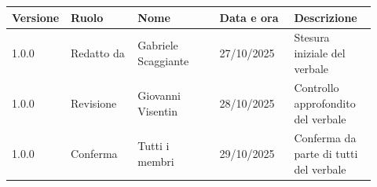 \documentclass[a4paper,12pt]{article}
\begin{document}
\begin{center}
\small
\renewcommand{\arraystretch}{1.2} 
\begin{tabular}{|p{0.1\linewidth}|p{0.18\linewidth}|p{0.22\linewidth}|p{0.20\linewidth}|p{0.22\linewidth}|}
\hline
\rowcolor{gray!60} 
\textbf{Versione} & \textbf{Ruolo} & \textbf{Nome} & \textbf{Data e ora} & \textbf{Descrizione} \\
\hline
\rowcolor{white}
1.0.0 & Redatto da & Gabriele Scaggiante & 27/10/2025 & Stesura iniziale del verbale \\
\hline
\rowcolor{gray!20}
1.0.0 & Revisione & Giovanni Visentin & 28/10/2025 & Controllo approfondito del verbale \\
\hline
\rowcolor{white}
1.0.0 & Conferma & Tutti i membri & 29/10/2025 & Conferma da parte di tutti del verbale \\
\hline

\end{tabular}
\end{center}


\end{document}
